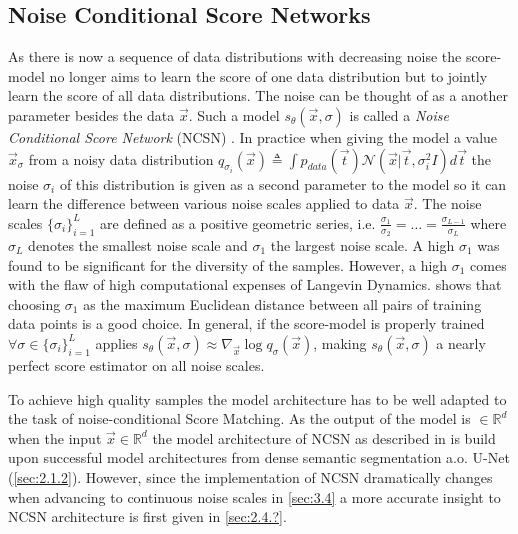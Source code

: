 \subsection{Noise Conditional Score Networks} \label{sec:3.3.1}
As there is now a sequence of data distributions with decreasing noise the score-model no longer aims to learn the score of one data distribution but to jointly learn the score of all data distributions. The noise can be thought of as a another parameter besides the data $\vec{x}$. Such a model $s_\theta(\vec{x}, \sigma)$ is called a \textit{Noise Conditional Score Network} (NCSN) \cite{score_1}. In practice when giving the model a value $\vec{x}_\sigma$ from a noisy data distribution $q_{\sigma_i}(\vec{x})\triangleq\int p_{data}(\vec{t})\mathcal{N}(\vec{x}|\vec{t},\sigma_i^2I)d\vec{t}$ the noise $\sigma_i$ of this distribution is given as a second parameter to the model so it can learn the difference between various noise scales applied to data $\vec{x}$. The noise scales $\{\sigma_i\}_{i=1}^L$ are defined as a positive geometric series, i.e. $\frac{\sigma_1}{\sigma_2}=\dots=\frac{\sigma_{L-1}}{\sigma_L}$ where $\sigma_L$ denotes the smallest noise scale and $\sigma_1$ the largest noise scale. A high $\sigma_1$ was found to be significant for the diversity of the samples. However, a high $\sigma_1$ comes with the flaw of high computational expenses of Langevin Dynamics. \cite{score_2} shows that choosing $\sigma_1$ as the maximum Euclidean distance between all pairs of training data points is a good choice. In general, if the score-model is properly trained $\forall\sigma\in\{\sigma_i\}_{i=1}^L$ applies $s_\theta(\vec{x}, \sigma)\approx\nabla_{\vec{x}}\log q_\sigma(\vec{x})$, making $s_\theta(\vec{x},\sigma)$ a nearly perfect score estimator on all noise scales. 

To achieve high quality samples the model architecture has to be well adapted to the task of noise-conditional Score Matching. As the output of the model is $\in\mathbb{R}^d$ when the input $\vec{x}\in\mathbb{R}^d$ the model architecture of NCSN as described in \cite{score_1} is build upon successful model architectures from dense semantic segmentation a.o. U-Net (\cref{sec:2.1.2}). However, since the implementation of NCSN dramatically changes when advancing to continuous noise scales in \cref{sec:3.4} a more accurate insight to NCSN architecture is first given in \cref{sec:2.4.?}.

